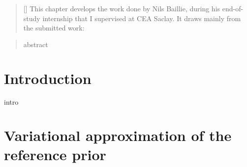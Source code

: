 

\begin{abstract}[\hspace*{-10pt}]
    This chapter develops the work
    done by Nils Baillie, during his end-of-study internship that I supervised at CEA Saclay.
    It draws mainly from the submitted work: 
\end{abstract}

\begin{abstract}
    abstract
\end{abstract}

\minitoc


\section{Introduction}

intro 

\section{Variational approximation of the reference prior}



